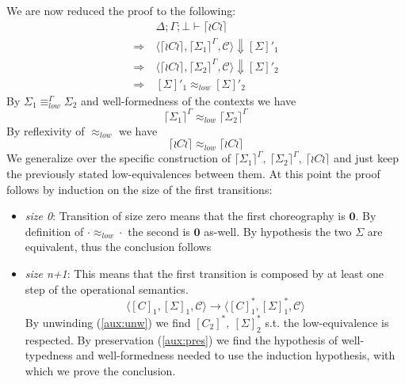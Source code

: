 \documentclass[12pt,a4paper,twoside]{book}
\begin{document}
\medskip
\noindent We are now reduced the proof to the following:
\begin{align*}
	&\Delta;\Gamma;\bot \vdash \lceil \wr C \wr \rceil \\
	\Rightarrow\ &\langle \lceil \wr C \wr \rceil, \lceil \Sigma_1 \rceil^\Gamma, \mathscr{C}\rangle \Downarrow [\Sigma]'_1 \\
	\Rightarrow\ &\langle \lceil \wr C \wr \rceil, \lceil \Sigma_2 \rceil^\Gamma, \mathscr{C}\rangle \Downarrow [\Sigma]'_2 \\
	\Rightarrow\ &[\Sigma]'_1 \approx_{low} [\Sigma]'_2
\end{align*}
By $\Sigma_1 \equiv^\Gamma_{low} \Sigma_2$ and well-formedness of the contexts we have
$$
\lceil \Sigma_1 \rceil^\Gamma \approx_{low} \lceil \Sigma_2 \rceil^\Gamma
$$
By reflexivity of $\approx_{low}$ we have
$$
\lceil \wr C \wr \rceil \approx_{low} \lceil \wr C \wr \rceil
$$
We generalize over the specific construction of
$ \lceil \Sigma_1 \rceil^\Gamma,~\lceil \Sigma_2 \rceil^\Gamma,~\lceil \wr C \wr \rceil $ and just keep the previously stated low-equivalences between them.
At this point the proof follows by induction on the size of the first transitions:
\begin{itemize}
	\item \emph{size 0}: Transition of size zero means that the first choreography is $\boldsymbol{0}$. By definition of $\cdot \approx_{low} \cdot$ the second is $\boldsymbol{0}$ as-well. By hypothesis the two $\Sigma$ are equivalent, thus the conclusion follows
	\item \emph{size n+1}: This means that the first transition is composed by at least one step of the operational semantics.
$$
		\langle [C]_1, [\Sigma]_1, \mathscr{C}\rangle \rightarrow
		\langle [C]_1^*, [\Sigma]_1^*, \mathscr{C}\rangle
$$
		By unwinding (\ref{aux:unw}) we find $[C_2]^*,~[\Sigma]_2^*$ s.t. the low-equivalence is respected.
		By preservation (\ref{aux:pres}) we find the hypothesis of well-typedness and well-formedness needed to use the induction hypothesis, with which we prove the conclusion.
\end{itemize}
\end{document}
